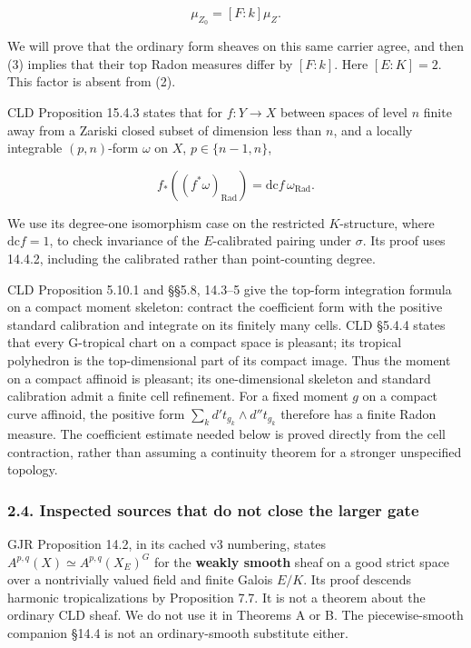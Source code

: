 \documentclass[
  11pt,
]{article}
\begin{document}
\[\mu_{Z_0}=[F:k]\mu_Z. \tag{3}\]

We will prove that the ordinary form sheaves on this same carrier agree,
and then (3) implies that their top Radon measures differ by \([F:k]\).
Here \([E:K]=2\). This factor is absent from (2).

CLD Proposition 15.4.3 states that for \(f:Y\to X\) between spaces of
level \(n\) finite away from a Zariski closed subset of dimension less
than \(n\), and a locally integrable \((p,n)\)-form \(\omega\) on \(X\),
\(p\in\{n-1,n\}\),

\[f_*((f^*\omega)_{\mathrm{Rad}})=\mathrm{dc}f\,\omega_{\mathrm{Rad}}.\]

We use its degree-one isomorphism case on the restricted
\(K\)-structure, where \(\mathrm{dc}f=1\), to check invariance of the
\(E\)-calibrated pairing under \(\sigma\). Its proof uses 14.4.2,
including the calibrated rather than point-counting degree.

CLD Proposition 5.10.1 and §§5.8, 14.3--5 give the top-form integration
formula on a compact moment skeleton: contract the coefficient form with
the positive standard calibration and integrate on its finitely many
cells. CLD §5.4.4 states that every G-tropical chart on a compact space
is pleasant; its tropical polyhedron is the top-dimensional part of its
compact image. Thus the moment on a compact affinoid is pleasant; its
one-dimensional skeleton and standard calibration admit a finite cell
refinement. For a fixed moment \(g\) on a compact curve affinoid, the
positive form \(\sum_k d't_{g_k}\wedge d''t_{g_k}\) therefore has a
finite Radon measure. The coefficient estimate needed below is proved
directly from the cell contraction, rather than assuming a continuity
theorem for a stronger unspecified topology.

\subsubsection{2.4. Inspected sources that do not close the larger
gate}\label{inspected-sources-that-do-not-close-the-larger-gate}

GJR Proposition 14.2, in its cached v3 numbering, states
\(A^{p,q}(X)\simeq A^{p,q}(X_E)^G\) for the \textbf{weakly smooth} sheaf
on a good strict space over a nontrivially valued field and finite
Galois \(E/K\). Its proof descends harmonic tropicalizations by
Proposition 7.7. It is not a theorem about the ordinary CLD sheaf. We do
not use it in Theorems A or B. The piecewise-smooth companion §14.4 is
not an ordinary-smooth substitute either.
\end{document}
